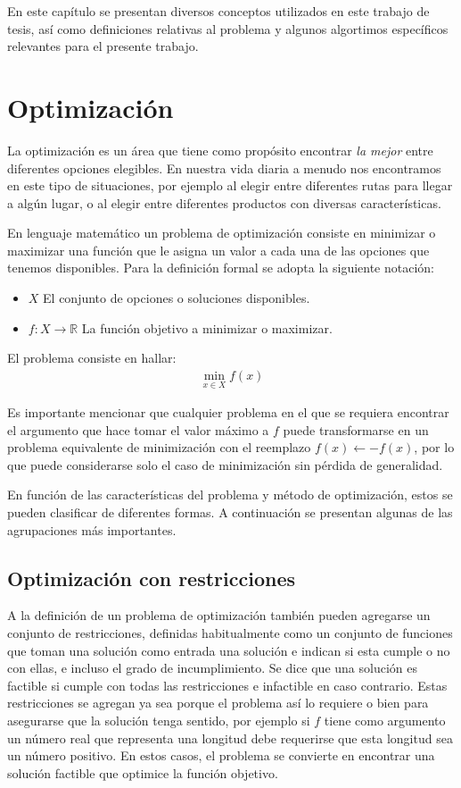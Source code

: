 En este capítulo se presentan diversos conceptos utilizados en este trabajo de tesis, así como definiciones relativas al problema 
y algunos algortimos específicos relevantes para el presente trabajo.

\section{Optimización}
La optimización es un área que tiene como propósito encontrar \textit{la mejor} entre diferentes opciones elegibles. 
%
En nuestra vida diaria a menudo nos encontramos en este tipo de situaciones, por ejemplo al elegir entre diferentes rutas para 
llegar a algún lugar, o al elegir entre diferentes productos con diversas características.

En lenguaje matemático un problema de optimización consiste en minimizar o maximizar una función que le asigna un valor a cada una 
de las opciones que tenemos disponibles. 
%
Para la definición formal se adopta la siguiente notación:
\begin{itemize}
    \item $X$ El conjunto de opciones o soluciones disponibles.
    \item $f:X\rightarrow \mathbb{R}$ La función objetivo a minimizar o maximizar.
\end{itemize}

El problema consiste en hallar:
\begin{gather}
\min_{x\in X} f(x)
\end{gather}

Es importante mencionar que cualquier problema en el que se requiera encontrar el argumento que hace tomar el valor máximo a $f$ 
puede transformarse en un problema equivalente de minimización con el reemplazo $f(x) \leftarrow -f(x)$, por lo que puede considerarse 
solo el caso de minimización sin pérdida de generalidad.

En función de las características del problema y método de optimización, estos se pueden clasificar de diferentes formas. 
%
A continuación se presentan algunas de las agrupaciones más importantes.

\subsection*{Optimización con restricciones}
A la definición de un problema de optimización también pueden agregarse un conjunto de restricciones, definidas habitualmente como
un conjunto de funciones que toman una solución como entrada una solución e indican si esta cumple o no con ellas, e incluso el grado
de incumplimiento.
%
Se dice que una solución es factible si cumple con todas las restricciones e infactible en caso contrario.
%
Estas restricciones se agregan ya sea porque el problema así lo requiere o bien para asegurarse que la solución tenga sentido, por ejemplo 
si $f$ tiene como argumento un número real que representa una longitud debe requerirse que esta longitud sea un número positivo.
%
En estos casos, el problema se convierte en encontrar una solución factible que optimice la función objetivo.

